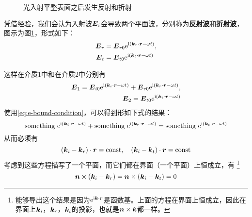 \documentclass[UTF8, a4paper]{ctexart}
\newcommand*{\const}{\mathrm{const}}
\newcommand*{\ii}{\mathrm{i}}
\newcommand*{\ee}{\mathrm{e}}
\newcommand*{\concept}[1]{\underline{\textbf{#1}}}
\begin{document}
\begin{figure}
    \centering
    \caption{光入射平整表面之后发生反射和折射}
    \label{fig:ray-refraction}
\end{figure}

凭借经验，我们会认为入射波$\vb*{E}_i$会导致两个平面波，分别称为\concept{反射波}和\concept{折射波}，图示为图\ref{fig:ray-refraction}，形式如下：
\[
    \begin{aligned}
        \vb*{E}_r &= \vb*{E}_{r0} \ee^{\ii(\vb*{k}_r \cdot \vb*{r} - \omega t)}, \\
        \vb*{E}_t &= \vb*{E}_{t0} \ee^{\ii(\vb*{k}_t \cdot \vb*{r} - \omega t)}
    \end{aligned}
\]

这样在介质1中和在介质2中分别有
\[
    \begin{aligned}
        \vb*{E}_1 = \vb*{E}_{i0} \ee^{\ii(\vb*{k}_i \cdot \vb*{r} - \omega t)} +  \vb*{E}_{r0} \ee^{\ii(\vb*{k}_r \cdot \vb*{r} - \omega t)}, \\
        \vb*{E}_2 = \vb*{E}_{t0} \ee^{\ii(\vb*{k}_t \cdot \vb*{r} - \omega t)}
    \end{aligned}
\]
使用\eqref{eq:e-bound-condition}，可以得到形如下式的结果：
\[
    \text{something } \ee^{\ii(\vb*{k}_i \cdot \vb*{r} - \omega t)} + \text{something } \ee^{\ii(\vb*{k}_r \cdot \vb*{r} - \omega t)} = \text{something } \ee^{\ii(\vb*{k}_t \cdot \vb*{r} - \omega t)}
\]
从而必须有
\[
    (\vb*{k}_i - \vb*{k}_r) \cdot \vb*{r} = \const, \quad (\vb*{k}_i - \vb*{k}_t) \cdot \vb*{r} = \const
\]
考虑到这些方程描写了一个平面，而它们都在界面（一个平面）上恒成立，有%
\footnote{能够导出这个结果是因为$\ee^{\ii \vb*{k} \cdot \vb*{r}}$是函数基。上面的方程在界面上恒成立，因此在界面上$\vb*{k}_i$，$\vb*{k}_r$，$\vb*{k}_t$的投影，也就是$\vb*{n} \times \vb*{k}$都一样。}
\begin{equation}
    \vb*{n} \times (\vb*{k}_i - \vb*{k}_r) = \vb*{n} \times (\vb*{k}_i - \vb*{k}_t) = 0
    \label{eq:k-and-n}
\end{equation}
\end{document}
